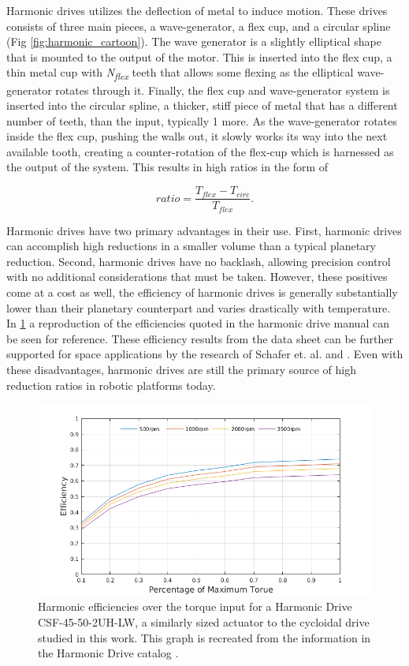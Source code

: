 Harmonic drives utilizes the deflection of metal to induce motion. These drives consists of three main pieces, a wave-generator, a flex cup, and a circular spline (Fig \ref{fig:harmonic_cartoon}). The wave generator is a slightly elliptical shape that is mounted to the output of the motor. This is inserted into the flex cup, a thin metal cup with \textit{N\textsubscript{flex}} teeth that allows some flexing as the elliptical wave-generator rotates through it. Finally, the flex cup and wave-generator system is inserted into the circular spline, a thicker, stiff piece of metal that has a different number of teeth,  than the input, typically 1 more. As the wave-generator rotates inside the flex cup, pushing the walls out, it slowly works its way into the next available tooth, creating a counter-rotation of the flex-cup which is harnessed as the output of the system. This results in high ratios in the form of 

\begin{equation} \label{eq:harmonic_ratio}
ratio = \frac{T_{flex} - T_{circ}} {T_{flex}}.
\end{equation}

Harmonic drives have two primary advantages in their use. First, harmonic drives can accomplish high reductions in a smaller volume than a typical planetary reduction. Second, harmonic drives have no backlash, allowing precision control with no additional considerations that must be taken. However, these positives come at a cost as well, the efficiency of harmonic drives is generally substantially lower than their planetary counterpart and varies drastically with temperature. In \ref{fig:harmonic_eff} a reproduction of the efficiencies quoted in the harmonic drive manual can be seen for reference. These efficiency results from the data sheet can be further supported for space applications by the research of Schafer et. al. \cite{ref:harmonic_space_lube} and \cite{ref:harmonic_performance}. Even with these disadvantages, harmonic drives are still the primary source of high reduction ratios in robotic platforms today. 

\begin{figure}[h]
   \centering
   \includegraphics[width=0.7\linewidth]{fig/harmonic_eff}
   \caption{Harmonic efficiencies over the torque input for a Harmonic Drive CSF-45-50-2UH-LW, a similarly sized actuator to the cycloidal drive studied in this work. This graph is recreated from the information in the Harmonic Drive catalog \cite{ref:harmonic_sheet}. }
   \label{fig:harmonic_eff}
\end{figure}

